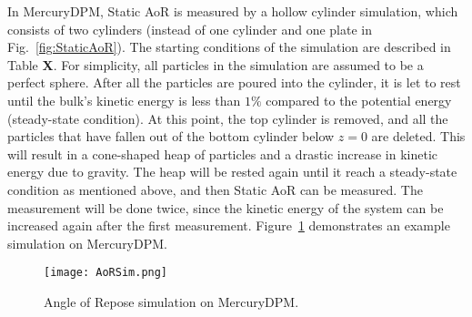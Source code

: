 In MercuryDPM, Static AoR is measured by a hollow cylinder simulation, which consists of two cylinders (instead of one cylinder and one plate in Fig.~\ref{fig:StaticAoR}). The starting conditions of the simulation are described in Table \textbf{X}. For simplicity, all particles in the simulation are assumed to be a perfect sphere. After all the particles are poured into the cylinder, it is let to rest until the bulk's kinetic energy is less than $1\%$ compared to the potential energy (steady-state condition). At this point, the top cylinder is removed, and all the particles that have fallen out of the bottom cylinder below $z = 0$ are deleted. This will result in a cone-shaped heap of particles and a drastic increase in kinetic energy due to gravity. The heap will be rested again until it reach a steady-state condition as mentioned above, and then Static AoR can be measured. The measurement will be done twice, since the kinetic energy of the system can be increased again after the first measurement. Figure~\ref{fig:MercuryAoR} demonstrates an example simulation on MercuryDPM.    

\begin{figure}[H]
    \centering
    \texttt{[image: AoRSim.png]}
    \caption{Angle of Repose simulation on MercuryDPM.}\label{fig:MercuryAoR}
\end{figure}

